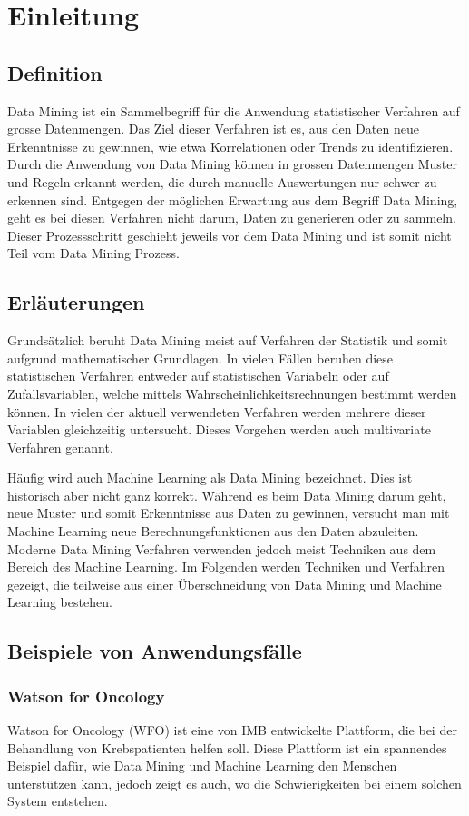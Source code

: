 \chapter{Einleitung}

\section{Definition}
Data Mining ist ein Sammelbegriff für die Anwendung statistischer Verfahren auf grosse Datenmengen. Das Ziel dieser Verfahren ist es, aus den Daten neue Erkenntnisse zu gewinnen, wie etwa Korrelationen oder Trends zu identifizieren. Durch die Anwendung von Data Mining können in grossen Datenmengen Muster und Regeln erkannt werden, die durch manuelle Auswertungen nur schwer zu erkennen sind.
Entgegen der möglichen Erwartung aus dem Begriff Data Mining, geht es bei diesen Verfahren nicht darum, Daten zu generieren oder zu sammeln. Dieser Prozessschritt geschieht jeweils vor dem Data Mining und ist somit nicht Teil vom Data Mining Prozess. \cite{definition}

\section{Erläuterungen}
Grundsätzlich beruht Data Mining meist auf Verfahren der Statistik und somit aufgrund mathematischer Grundlagen. In vielen Fällen beruhen diese statistischen Verfahren entweder auf statistischen Variabeln oder auf Zufallsvariablen, welche mittels Wahrscheinlichkeitsrechnungen bestimmt werden können. In vielen der aktuell verwendeten Verfahren werden mehrere dieser Variablen gleichzeitig untersucht. Dieses Vorgehen werden auch multivariate Verfahren genannt.

Häufig wird auch Machine Learning als Data Mining bezeichnet. Dies ist historisch aber nicht ganz korrekt. Während es beim Data Mining darum geht, neue Muster und somit Erkenntnisse aus Daten zu gewinnen, versucht man mit Machine Learning neue Berechnungsfunktionen aus den Daten abzuleiten. Moderne Data Mining Verfahren verwenden jedoch meist Techniken aus dem Bereich des Machine Learning. Im Folgenden werden Techniken und Verfahren gezeigt, die teilweise aus einer Überschneidung von Data Mining und Machine Learning bestehen. \cite{dmdefinition}

\clearpage
\section{Beispiele von Anwendungsfälle}
\subsection{Watson for Oncology}
Watson for Oncology (WFO) ist eine von IMB entwickelte Plattform, die bei der Behandlung von Krebspatienten helfen soll. Diese Plattform ist ein spannendes Beispiel dafür, wie Data Mining und Machine Learning den Menschen unterstützen kann, jedoch zeigt es auch, wo die Schwierigkeiten bei einem solchen System entstehen.

